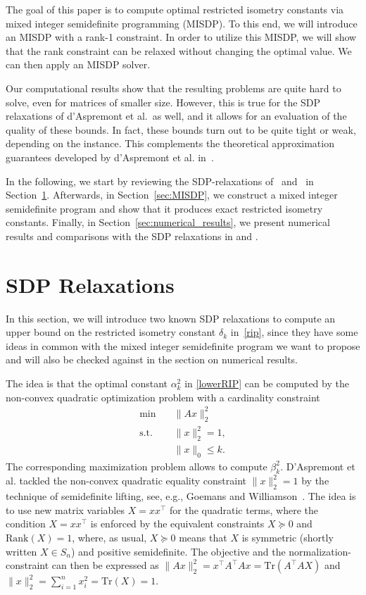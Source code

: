 \documentclass[journal]{IEEEtran}
\newcommand{\Norm}[2]{\lVert{#1}\rVert_{#2}}
\newcommand{\T}{^{\top}}
\newcommand{\Tr}{\text{Tr}}
\newcommand{\Rk}{\text{Rank}}
\begin{document}
The goal of this paper is to compute optimal restricted isometry constants
via mixed integer semidefinite programming (MISDP). To this end, we will
introduce an MISDP with a rank-1 constraint. In order to utilize this
MISDP, we will show that the rank constraint can be relaxed without
changing the optimal value. We can then apply an MISDP solver.

Our computational results show that the resulting problems are quite
hard to solve, even for matrices of smaller size. However, this is true for
the SDP relaxations of d'Aspremont et al.\ as well, and it allows for an
evaluation of the quality of these bounds.  In fact, these bounds turn out
to be quite tight or weak, depending on the instance. This complements the
theoretical approximation guarantees developed by d'Aspremont et
al. in~\cite{AspBG14}.

In the following, we start by reviewing the SDP-relaxations of~\cite{Asp08}
and~\cite{Asp07} in Section~\ref{sec:SDPrelax}.  Afterwards, in
Section~\ref{sec:MISDP}, we construct a mixed integer semidefinite
program and show that it produces exact restricted isometry
constants. Finally, in Section~\ref{sec:numerical_results}, we present
numerical results and comparisons with the SDP relaxations in \cite{Asp08}
and \cite{Asp07}.


\section{SDP Relaxations}
\label{sec:SDPrelax}

\noindent
In this section, we will introduce two known SDP relaxations to compute an upper bound on the restricted isometry constant $\delta_k$ in~\eqref{rip}, since they have some ideas in common with the mixed integer semidefinite program we want to 
propose and will also be checked against in the section on numerical
results.

The idea is that the optimal constant $\alpha_k^2$ in \eqref{lowerRIP} can be computed
by the non-convex quadratic optimization problem with a cardinality constraint
\begin{equation}\label{QP}\tag{QP}
 \begin{aligned}
  \min \quad & \Norm{Ax}{2}^2  \\
  \text{s.t.} \quad & \Norm{x}{2}^2 = 1,  \\
  & \Norm{x}{0} \leq k. 
 \end{aligned}
\end{equation}
The corresponding maximization problem allows to compute $\beta_k^2$. D'Aspremont et al. \cite{Asp07} tackled the non-convex quadratic equality constraint 
$\Norm{x}{2}^2 = 1$ by the technique of semidefinite lifting, see, e.g., Goemans and Williamson~\cite{GW95}.
The idea is to use new matrix variables $X=xx\T$ for the quadratic terms, where the condition $X=xx\T$ is enforced by the equivalent constraints $X \succeq 0$ and $\Rk(X) = 1$, where, as usual, 
$X \succeq 0$ means that $X$ is symmetric (shortly written $X \in S_n$) and positive semidefinite. The objective and the normalization-constraint can then be expressed as  $\Norm{Ax}{2}^2 = x\T A\T Ax =
\Tr(A\T A X)$ and $\Norm{x}{2}^2 = \sum_{i=1}^n x_i^2 = \Tr(X) = 1$.
\end{document}
